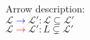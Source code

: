 \documentclass[10pt]{article}
\begin{document}
\begin{figure}[h]
    \caption{Arrow description:\\$\mathcal{L}$\textcolor{blue}{$\rightarrow$}$\mathcal{L}':\mathcal{L}\subseteq
    \mathcal{L}'$ \\
    $\mathcal{L}$\textcolor{red}{$\rightarrow$}$\mathcal{L}':L\subsetneq
    \mathcal{L}'$}
  \end{figure}
\end{document}
